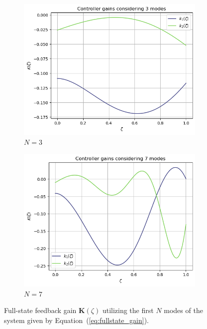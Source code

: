 \begin{figure}[!htbp]
    \centering
    \begin{subfigure}[b]{0.45\textwidth}
        \centering
        \includegraphics[width=\textwidth]{Figures/k_3.png}
        \caption{$N = 3$}
        \label{fig:k_3}
    \end{subfigure}
    \hfill
    \begin{subfigure}[b]{0.45\textwidth}
        \centering
        \includegraphics[width=\textwidth]{Figures/k_7.png}
        \caption{$N = 7$}
        \label{fig:k_7}
    \end{subfigure}
    \caption{Full-state feedback gain $\bm{K}(\zeta)$ utilizing the first $N$ modes of the system given by Equation~(\ref{eq:fullstate_gain}).}
    \label{fig:k_modes}
\end{figure}

